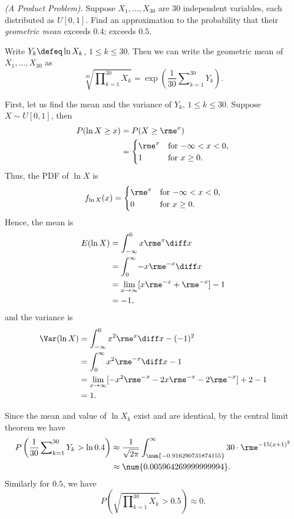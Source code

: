 \begin{problem}[Handout 14, \# 8]
  \emph{(A Product Problem).} Suppose \(X_1,\dotsc,X_{30}\) are \(30\)
  independent variables, each distributed as \(U[0,1]\). Find an
  approximation to the probability that their \emph{geometric mean} exceeds
  \(0.4\); exceeds \(0.5\).
\end{problem}
\begin{solution}
  Write \(Y_k\defeq \ln X_k\), \(1\leq k\leq 30\). Then we can write the
  geometric mean of \(X_1,\dotsc,X_{30}\) as
  \[
    \sqrt[30]{\prod\nolimits_{k=1}^{30} X_k}
    =\exp\left(\frac{1}{30}\sum\nolimits_{k=1}^{30} Y_k\right).
  \]

  First, let us find the mean and the variance of \(Y_k\), \(1\leq k\leq
  30\). Suppose \(X\sim U[0,1]\), then
  \begin{align*}
    P(\ln X\geq x)
    &=P(X\geq\rme^x)\\
    &=\begin{cases}
      \rme^x&\text{for \(-\infty<x<0\),}\\
      1&\text{for \(x\geq 0\).}
    \end{cases}
  \end{align*}
  Thus, the PDF of \(\ln X\) is
  \[
    f_{\ln X}(x)=
    \begin{cases}
      \rme^x&\text{for \(-\infty<x<0\),}\\
      0&\text{for \(x\geq 0\).}
    \end{cases}
  \]
  Hence, the mean is
  \begin{align*}
    E(\ln X)
    &=\int_{-\infty}^0 x\rme^x\diff x\\
    &=\int_0^\infty -x\rme^{-x}\diff x\\
    &=\lim_{x\to\infty}[x\rme^{-x}+\rme^{-x}]-1\\
    &=-1,
  \end{align*}
  and the variance is
  \begin{align*}
    \Var(\ln X)
    &=\int_{-\infty}^0 x^2\rme^x\diff x-(-1)^2\\
    &=\int_0^\infty x^2\rme^{-x}\diff x-1\\
    &=\lim_{x\to\infty}[-x^2\rme^{-x}-2x\rme^{-x}-2\rme^{-x}]+2-1\\
    &=1.
  \end{align*}

  Since the mean and value of \(\ln X_k\) exist and are identical, by the
  central limit theorem we have
  \begin{align*}
    P\left(\frac{1}{30}\sum\nolimits_{k=1}^{30} Y_k>\ln 0.4\right)
    &\approx\frac{1}{\sqrt{2\pi}}%
      \int_{\num{-0.916290731874155}}^\infty%
      30\cdot \rme^{-15(x+1)^2}\\
    &\approx\num{0.005964269999999994}.
  \end{align*}
  Similarly for \(0.5\), we have
  \[
    P\left(\sqrt{\prod\nolimits_{k=1}^{30} X_k}>0.5\right)
    \approx 0.
  \]
\end{solution}
\newpage


